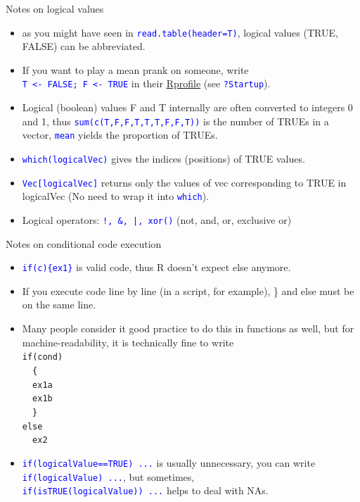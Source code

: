 \documentclass[xcolor=table,           xcolor=dvipsnames]{beamer}\usepackage[]{graphicx}\usepackage[]{color}
\newcommand{\rcode}[1]{\texttt{\textcolor{Blue}{#1}}} %
\begin{document}
\begin{frame}[fragile]{Notes on logical values}
\begin{itemize}[<+->]
\item as you might have seen in \rcode{read.table(header=T)}, logical values (TRUE, FALSE) can be abbreviated.
\item If you want to play a mean prank on someone, write\\ \rcode{T <- FALSE; F <- TRUE} in their \href{https://rclickhandbuch.wordpress.com/install-r/rprofile/}{Rprofile} (see \rcode{?Startup}).
\item Logical (boolean) values F and T internally are often converted to integers 0 and 1, thus \rcode{sum(c(T,F,F,T,T,T,F,F,T))} is the number of TRUEs in a vector, \rcode{mean} yields the proportion of TRUEs.
\item \rcode{which(logicalVec)} gives the indices (positions) of TRUE values.
\item \rcode{Vec[logicalVec]} returns only the values of vec corresponding to TRUE in logicalVec (No need to wrap it into \rcode{which}).
\item Logical operators: \rcode{!, \&, |, xor()} (not, and, or, exclusive or)
\end{itemize}
\end{frame}


\begin{frame}[fragile]{Notes on conditional code execution}
\begin{itemize}[<+->]
\item \rcode{\alert{if}(c)\{ex1\}} is valid code, thus R doesn't expect \alert{else} anymore.
\item If you execute code line by line (in a script, for example), \alert{\}} and \alert{else} must be on the same line.
\item Many people consider it good practice to do this in functions as well, but for machine-readability, it is technically fine to write\\
\texttt{\alert{if}(cond)\\
~~\{\\
~~ex1a\\
~~ex1b\\
~~\} \\
\alert{else}\\
~~ex2}
\item \rcode{\alert{if}(logicalValue==TRUE) ...} is usually unnecessary, you can write\\
\onslide<+-> \rcode{\alert{if}(logicalValue) ...}, but sometimes,\\
\onslide<+->  \rcode{\alert{if}(isTRUE(logicalValue)) ...} helps to deal with NAs.
\end{itemize}
\end{frame}
\end{document}
